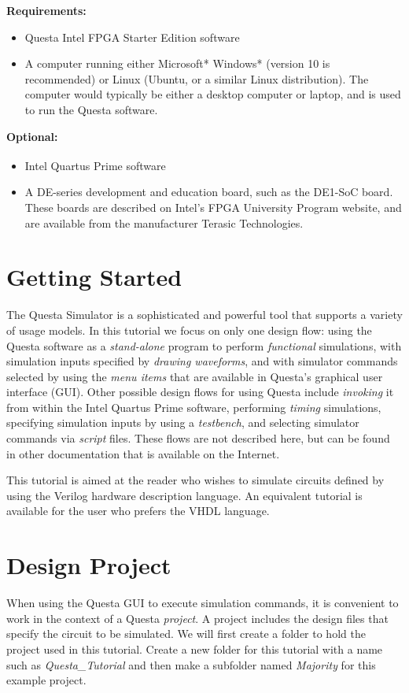 \documentclass[11pt, twoside, pdftex]{article}
\begin{document}
{\bf Requirements:}
\begin{itemize}
\item Questa Intel FPGA Starter Edition software
\item A computer running either Microsoft* Windows* (version 10 is recommended) or Linux 
(Ubuntu, or a similar Linux distribution). The computer would typically be either a
desktop computer or laptop, and is used to run the Questa software.
\end{itemize}

{\bf Optional:}
\begin{itemize}
\item Intel Quartus\textsuperscript{\textregistered} Prime software
\item A DE-series development and education board, such as the DE1-SoC board. These boards are 
described on Intel's FPGA University Program website, and are available from the manufacturer 
Terasic Technologies.
\end{itemize}
\clearpage
\newpage
\section{Getting Started}

The Questa Simulator is a sophisticated and powerful tool that supports a variety of 
usage models. In this tutorial we focus on only one design flow: using the Questa
software as a {\it stand-alone} program to perform {\it functional} simulations, with 
simulation inputs specified by {\it drawing waveforms}, and with simulator commands selected 
by using the {\it menu items} that are available in Questa's graphical user interface
(GUI).  Other possible design flows for using Questa include {\it invoking} it from within the 
Intel Quartus Prime software, performing {\it timing} simulations, specifying simulation 
inputs by using a {\it testbench}, and selecting simulator commands via {\it script} files.
These flows are not described here, but can be found in other
documentation that is available on the Internet.  

This tutorial is aimed at the reader who wishes to simulate circuits defined
by using the Verilog hardware description language. An equivalent tutorial is
available for the user who prefers the VHDL language.
 
\section{Design Project}
When using the Questa GUI to execute simulation commands, it is convenient to work in the
context of a Questa {\it project}. A project includes the design files that specify the 
circuit to be simulated. We will first create a folder to hold the project used 
in this tutorial.  Create a new folder for this tutorial with a name such as
{\it Questa\_Tutorial} and then make a subfolder named {\it Majority} for this 
example project.
\end{document}
